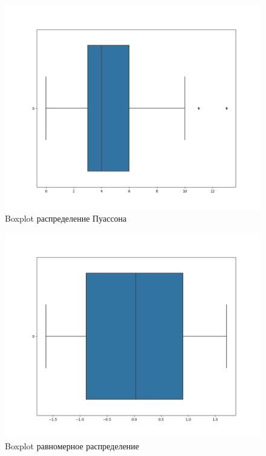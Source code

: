 \documentclass[a4]{article}
\begin{document}
\begin{center}
	\begin{figure}[H]
		\caption{Boxplot распределение Пуассона }
		\includegraphics[width=\textwidth]{Lab3_boxplot_N=100_poisson.png} 
	\end{figure}
	
	\begin{figure}[H]
		\caption{Boxplot равномерное распределение }
		\includegraphics[width=\textwidth]{Lab3_boxplot_N=100_uniform.png}
	\end{figure}
	
	\begin{table}[H]
		

\end{table}
\end{center}
\end{document}
